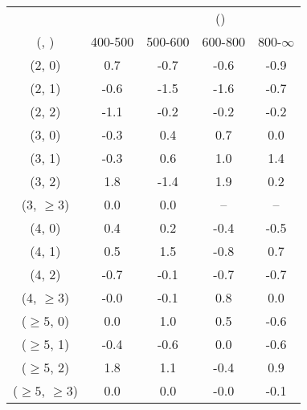 \begin{table}[h!]
\tiny
\centering
{}
\begin{tabular}
{ccccc}
	\hline\hline
&	& \multicolumn{4}{c}{\scalht (\gev)} \\ 
	 (\njet,  \nb) & 400-500 & 500-600 & 600-800 & 800-$\infty$ \\ [0.8ex] 
\hline
	(2, 0) & 0.7 & -0.7 & -0.6 & -0.9 \\[0.5ex] 
	(2, 1) & -0.6 & -1.5 & -1.6 & -0.7 \\[0.5ex] 
	(2, 2) & -1.1 & -0.2 & -0.2 & -0.2 \\[0.5ex] 
	(3, 0) & -0.3 & 0.4 & 0.7 & 0.0 \\[0.5ex] 
	(3, 1) & -0.3 & 0.6 & 1.0 & 1.4 \\[0.5ex] 
	(3, 2) & 1.8 & -1.4 & 1.9 & 0.2 \\[0.5ex] 
	(3, $\ge3$) & 0.0 & 0.0 & -- & -- \\[0.5ex] 
	(4, 0) & 0.4 & 0.2 & -0.4 & -0.5 \\[0.5ex] 
	(4, 1) & 0.5 & 1.5 & -0.8 & 0.7 \\[0.5ex] 
	(4, 2) & -0.7 & -0.1 & -0.7 & -0.7 \\[0.5ex] 
	(4, $\ge3$) & -0.0 & -0.1 & 0.8 & 0.0 \\[0.5ex] 
	($\ge5$, 0) & 0.0 & 1.0 & 0.5 & -0.6 \\[0.5ex] 
	($\ge5$, 1) & -0.4 & -0.6 & 0.0 & -0.6 \\[0.5ex] 
	($\ge5$, 2) & 1.8 & 1.1 & -0.4 & 0.9 \\[0.5ex] 
	($\ge5$, $\ge3$) & 0.0 & 0.0 & -0.0 & -0.1 \\[0.5ex] 
	\hline
	\hline
\end{tabular}
\end{table}
